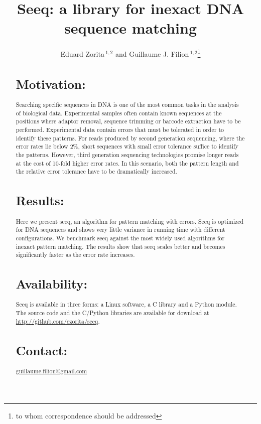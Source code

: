 \documentclass{bioinfo}
\begin{document}

\title[short Title]{Seeq: a library for inexact DNA sequence matching}
\author[Zorita \textit{et~al}]{Eduard Zorita\,$^{1,2}$ and Guillaume J. Filion\,$^{1,2}$\footnote{to whom correspondence should be addressed}}
\address{$^{1}$Genome Architecture, Gene Regulation, Stem Cells and
  Cancer Programme, Centre for Genomic Regulation (CRG), Dr. Aiguader
  88, 08003 Barcelona, Spain\\
$^{2}$Universitat Pompeu Fabra (UPF), 08002 Barcelona, Spain}



\maketitle

\begin{abstract}

\section{Motivation:}
Searching specific sequences in DNA is one of the most common tasks
in the analysis of biological data. Experimental samples often contain
known sequences at the positions where adaptor removal, sequence
trimming or barcode extraction have to be performed. Experimental data
contain errors that must be tolerated in order to identify these
patterns. For reads produced by second generation sequencing,
where the error rates lie below 2\%, short sequences with small error
tolerance suffice to identify the patterns. However, third generation
sequencing technologies promise longer reads at the cost of 10-fold
higher error rates. In this scenario, both the pattern length and the
relative error tolerance have to be dramatically increased.
\section{Results:}
Here we present seeq, an algorithm for pattern matching with errors.
Seeq is optimized for DNA sequences and shows very little variance in
running time with different configurations. We benchmark seeq against
the most widely used algorithms for inexact pattern matching. The
results show that seeq scales better and becomes significantly faster
as the error rate increases.
\section{Availability:}
Seeq is available in three forms: a Linux software, a C library and a 
Python module. The source code and the C/Python libraries are available
for download at
\href{http://github.com/ezorita/seeq}{http://github.com/ezorita/seeq}.
\section{Contact:} \href{guillaume.filion@gmail.com}{guillaume.filion@gmail.com}
\end{abstract}
\end{document}
